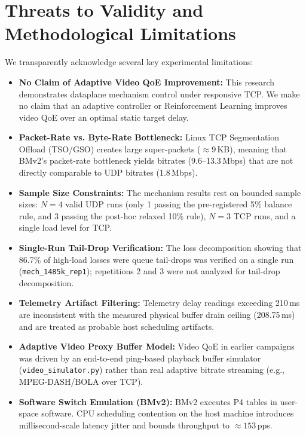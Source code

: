 \documentclass[12pt,a4paper,oneside]{report}
\begin{document}
\section{Threats to Validity and Methodological Limitations}
\label{sec:threats_to_validity}
We transparently acknowledge several key experimental limitations:
\begin{itemize}
  \item \textbf{No Claim of Adaptive Video QoE Improvement:} This research demonstrates dataplane mechanism control under responsive TCP. We make no claim that an adaptive controller or Reinforcement Learning improves video QoE over an optimal static target delay.
  \item \textbf{Packet-Rate vs. Byte-Rate Bottleneck:} Linux TCP Segmentation Offload (TSO/GSO) creates large super-packets ($\approx 9$\,KB), meaning that BMv2's packet-rate bottleneck yields bitrates (9.6--13.3\,Mbps) that are not directly comparable to UDP bitrates (1.8\,Mbps).
  \item \textbf{Sample Size Constraints:} The mechanism results rest on bounded sample sizes: $N=4$ valid UDP runs (only 1 passing the pre-registered 5\% balance rule, and 3 passing the post-hoc relaxed 10\% rule), $N=3$ TCP runs, and a single load level for TCP.
  \item \textbf{Single-Run Tail-Drop Verification:} The loss decomposition showing that 86.7\% of high-load losses were queue tail-drops was verified on a single run (\texttt{mech\_1485k\_rep1}); repetitions 2 and 3 were not analyzed for tail-drop decomposition.
  \item \textbf{Telemetry Artifact Filtering:} Telemetry delay readings exceeding 210\,ms are inconsistent with the measured physical buffer drain ceiling (208.75\,ms) and are treated as probable host scheduling artifacts.
  \item \textbf{Adaptive Video Proxy Buffer Model:} Video QoE in earlier campaigns was driven by an end-to-end ping-based playback buffer simulator (\texttt{video\_simulator.py}) rather than real adaptive bitrate streaming (e.g., MPEG-DASH/BOLA over TCP).
  \item \textbf{Software Switch Emulation (BMv2):} BMv2 executes P4 tables in user-space software. CPU scheduling contention on the host machine introduces millisecond-scale latency jitter and bounds throughput to $\approx 153$\,pps.
\end{itemize}


\end{document}
